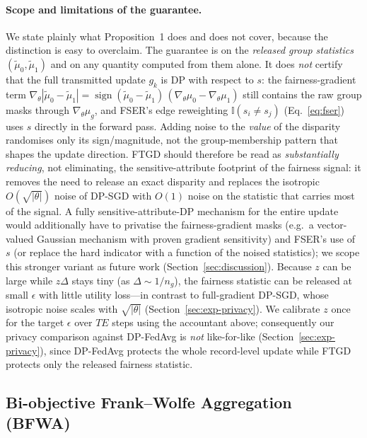 \documentclass[pdflatex,sn-mathphys-num]{sn-jnl}
\theoremstyle{thmstyleone}%
\theoremstyle{thmstyletwo}%
\theoremstyle{thmstylethree}%
\begin{document}
\paragraph{Scope and limitations of the guarantee.}
We state plainly what Proposition~1 does and does not cover, because the
distinction is easy to overclaim. The guarantee is on the \emph{released group
statistics} $(\tilde\mu_0,\tilde\mu_1)$ and on any quantity computed from them
alone. It does \emph{not} certify that the full transmitted update $g_k$ is DP
with respect to $s$: the fairness-gradient term
$\nabla_\theta|\tilde\mu_0-\tilde\mu_1|
=\operatorname{sign}(\tilde\mu_0-\tilde\mu_1)\,(\nabla_\theta\mu_0-\nabla_\theta\mu_1)$
still contains the raw group masks through $\nabla_\theta\mu_g$, and FSER's edge
reweighting $\mathbb{I}(s_i\neq s_j)$ (Eq.~\ref{eq:fser}) uses $s$ directly in
the forward pass. Adding noise to the \emph{value} of the disparity randomises
only its sign/magnitude, not the group-membership pattern that shapes the update
direction. FTGD should therefore be read as \emph{substantially reducing}, not
eliminating, the sensitive-attribute footprint of the fairness signal: it
removes the need to release an exact disparity and replaces the isotropic
$O(\sqrt{|\theta|})$ noise of DP-SGD with $O(1)$ noise on the statistic that
carries most of the signal. A fully sensitive-attribute-DP mechanism for the
entire update would additionally have to privatise the fairness-gradient masks
(e.g.\ a vector-valued Gaussian mechanism with proven gradient sensitivity) and
FSER's use of $s$ (or replace the hard indicator with a function of the noised
statistics); we scope this stronger variant as future work
(Section~\ref{sec:discussion}). Because $z$ can be large while $z\Delta$ stays
tiny (as $\Delta\!\sim\!1/n_g$), the fairness statistic can be released at small
$\epsilon$ with little utility loss---in contrast to full-gradient DP-SGD, whose
isotropic noise scales with $\sqrt{|\theta|}$ (Section~\ref{sec:exp-privacy}).
We calibrate $z$ once for the target $\epsilon$ over $TE$ steps using the
accountant above; consequently our privacy comparison against DP-FedAvg is
\emph{not} like-for-like (Section~\ref{sec:exp-privacy}), since DP-FedAvg
protects the whole record-level update while FTGD protects only the released
fairness statistic.

\subsection{Bi-objective Frank--Wolfe Aggregation (BFWA)}
\label{sec:bfwa}
\end{document}
